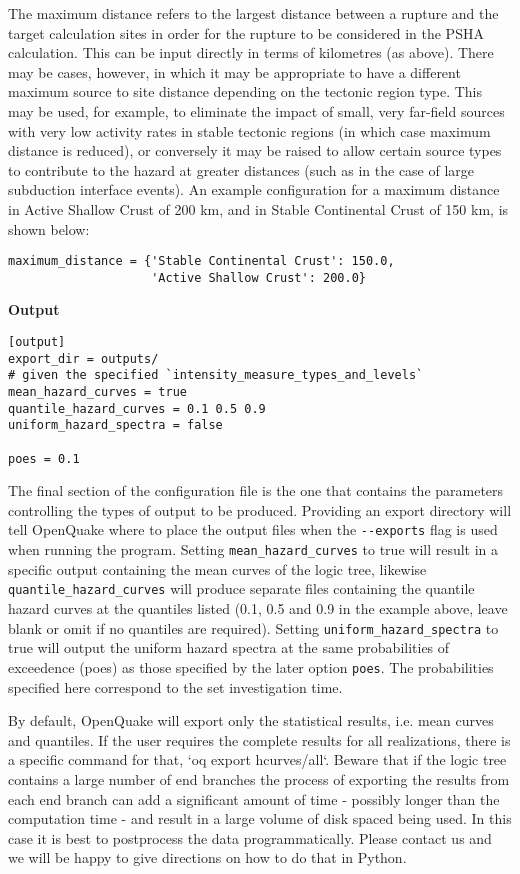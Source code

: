 The maximum distance refers to the largest distance between a rupture and the target calculation sites in order for the rupture to be considered in the PSHA calculation. This can be input directly in terms of kilometres (as above). There may be cases, however, in which it may be appropriate to have a different maximum source to site distance depending on the tectonic region type. This may be used, for example, to eliminate the impact of small, very far-field sources with very low activity rates in stable tectonic regions (in which case maximum distance is reduced), or conversely it may be raised to allow certain source types to contribute to the hazard at greater distances (such as in the case of large subduction interface events). An example configuration for a maximum distance in Active Shallow Crust of 200 km, and in Stable Continental Crust of 150 km, is shown below:
\begin{verbatim}
maximum_distance = {'Stable Continental Crust': 150.0,
                    'Active Shallow Crust': 200.0}
\end{verbatim}


\textbf{Output}

\begin{verbatim}
[output]
export_dir = outputs/
# given the specified `intensity_measure_types_and_levels`
mean_hazard_curves = true
quantile_hazard_curves = 0.1 0.5 0.9
uniform_hazard_spectra = false

poes = 0.1
\end{verbatim}

The final section of the configuration file is the one that contains the
parameters controlling the types of output to be produced. Providing an export directory will tell OpenQuake where to place the output files when the \texttt{-{}-exports} flag is used when running the program. Setting \verb=mean_hazard_curves= to true will result in a specific output containing the mean curves of the logic tree, likewise \verb=quantile_hazard_curves= will produce separate files containing the quantile hazard curves at the quantiles listed (0.1, 0.5 and 0.9 in the example above, leave blank or omit if no quantiles are required). Setting \verb=uniform_hazard_spectra= to true will output the uniform hazard spectra at the same probabilities of exceedence (poes) as those specified by the later option \verb=poes=. The probabilities specified here correspond to the set investigation time. 

By default, OpenQuake will export only the statistical results, i.e. mean curves and quantiles. If the user requires the complete results for all realizations, there is a specific command for that, `oq export hcurves/all`. Beware that if the logic tree contains a large number of end branches the process of exporting the results from each end branch can add a significant amount of time - possibly longer than the computation time - and result in a large volume of disk spaced being used. In this case it is best to postprocess the data programmatically. Please contact us and we will be happy to give directions on how to do that in Python.
